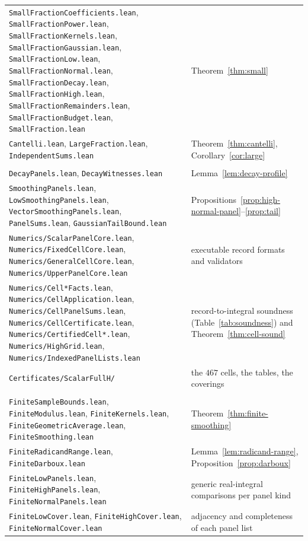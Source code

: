 \documentclass[10pt,a4paper]{article}
\theoremstyle{plain}
\theoremstyle{definition}
\newcommand{\file}[1]{\texttt{#1}}
\begin{document}
{\begin{longtable}{@{}p{5.6cm}p{9.2cm}@{}}
\file{SmallFractionCoefficients.lean}, \file{SmallFractionPower.lean}, \file{SmallFractionKernels.lean}, \file{SmallFractionGaussian.lean}, \file{SmallFractionLow.lean}, \file{SmallFractionNormal.lean}, \file{SmallFractionDecay.lean}, \file{SmallFractionHigh.lean}, \file{SmallFractionRemainders.lean}, \file{SmallFractionBudget.lean}, \file{SmallFraction.lean} & Theorem~\ref{thm:small} \\
\file{Cantelli.lean}, \file{LargeFraction.lean}, \file{IndependentSums.lean} & Theorem~\ref{thm:cantelli}, Corollary~\ref{cor:large} \\
\addlinespace
\multicolumn{2}{@{}l}{\emph{Region III}}\\
\file{DecayPanels.lean}, \file{DecayWitnesses.lean} & Lemma~\ref{lem:decay-profile} \\
\file{SmoothingPanels.lean}, \file{LowSmoothingPanels.lean}, \file{VectorSmoothingPanels.lean}, \file{PanelSums.lean}, \file{GaussianTailBound.lean} & Propositions~\ref{prop:high-normal-panel}--\ref{prop:tail} \\
\file{Numerics/ScalarPanelCore.lean}, \file{Numerics/FixedCellCore.lean}, \file{Numerics/GeneralCellCore.lean}, \file{Numerics/UpperPanelCore.lean} & executable record formats and validators \\
\file{Numerics/Cell*Facts.lean}, \file{Numerics/CellApplication.lean}, \file{Numerics/CellPanelSums.lean}, \file{Numerics/CellCertificate.lean}, \file{Numerics/CertifiedCell*.lean}, \file{Numerics/HighGrid.lean}, \file{Numerics/IndexedPanelLists.lean} & record-to-integral soundness (Table~\ref{tab:soundness}) and Theorem~\ref{thm:cell-sound} \\
\file{Certificates/ScalarFullH/} & the $467$ cells, the tables, the coverings \\
\addlinespace
\multicolumn{2}{@{}l}{\emph{Region IV}}\\
\file{FiniteSampleBounds.lean}, \file{FiniteModulus.lean}, \file{FiniteKernels.lean}, \file{FiniteGeometricAverage.lean}, \file{FiniteSmoothing.lean} & Theorem~\ref{thm:finite-smoothing} \\
\file{FiniteRadicandRange.lean}, \file{FiniteDarboux.lean} & Lemma~\ref{lem:radicand-range}, Proposition~\ref{prop:darboux} \\
\file{FiniteLowPanels.lean}, \file{FiniteHighPanels.lean}, \file{FiniteNormalPanels.lean} & generic real-integral comparisons per panel kind \\
\file{FiniteLowCover.lean}, \file{FiniteHighCover.lean}, \file{FiniteNormalCover.lean} & adjacency and completeness of each panel list \\

\end{longtable}}
\end{document}
